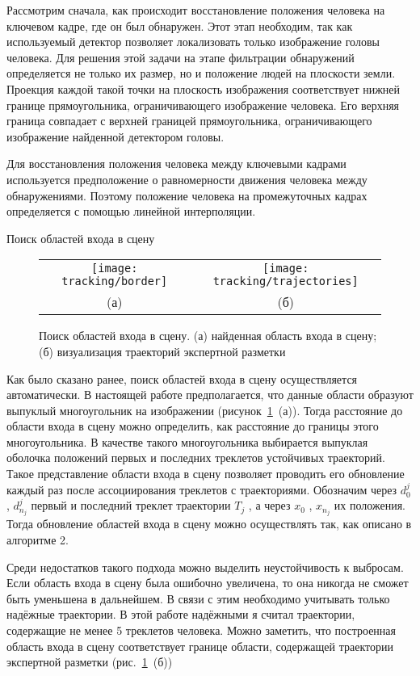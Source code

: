 Рассмотрим сначала, как происходит восстановление положения человека на ключевом кадре, где он был обнаружен. Этот этап необходим, так как используемый детектор позволяет локализовать только изображение головы человека. Для решения этой задачи на этапе фильтрации обнаружений определяется не только их размер, но и положение людей на плоскости земли. Проекция каждой такой точки на плоскость изображения соответствует нижней границе прямоугольника, ограничивающего изображение человека. Его верхняя граница совпадает с верхней границей прямоугольника, ограничивающего изображение найденной детектором головы.

Для восстановления положения человека между ключевыми кадрами используется предположение о равномерности движения человека между обнаружениями. Поэтому положение человека на промежуточных кадрах определяется с помощью линейной интерполяции.

Поиск областей входа в сцену

\begin{figure}[t]
	\begin{center}
		\begin{tabular}{cc}
		 \texttt{[image: tracking/border]} & \texttt{[image: tracking/trajectories]} \\
		(а) & (б)
		\end{tabular}
		\caption{Поиск областей входа в сцену. (а) найденная область входа в сцену; (б) визуализация траекторий экспертной разметки}
		\label{sec::tracking::fig::border}
	\end{center}
\end{figure}

Как было сказано ранее, поиск областей входа в сцену осуществляется автоматически. В настоящей работе предполагается, что данные области образуют выпуклый многоугольник на изображении (рисунок~\ref{sec::tracking::fig::border}~(а)). Тогда расстояние до области входа в сцену можно определить, как расстояние до границы этого многоугольника. В качестве такого многоугольника выбирается выпуклая оболочка положений первых и последних треклетов устойчивых траекторий. Такое представление области входа в сцену позволяет проводить его обновление каждый раз после ассоциирования треклетов с траекториями. Обозначим через $d_0^j$, $d_{n_j}^j$ первый и последний треклет траектории $T_j$ , а через $x_0$ , $x_{n_j}$ их положения. Тогда обновление областей входа в сцену можно осуществлять так, как описано в алгоритме 2.

Среди недостатков такого подхода можно выделить неустойчивость к выбросам. Если область входа в сцену была ошибочно увеличена, то она никогда не сможет быть уменьшена в дальнейшем. В связи с этим необходимо учитывать только надёжные траектории. В этой работе надёжными я считал траектории, содержащие не менее 5 треклетов человека. Можно заметить, что построенная область входа в сцену соответствует границе области, содержащей траектории экспертной разметки (рис.~\ref{sec::tracking::fig::border}~(б))

